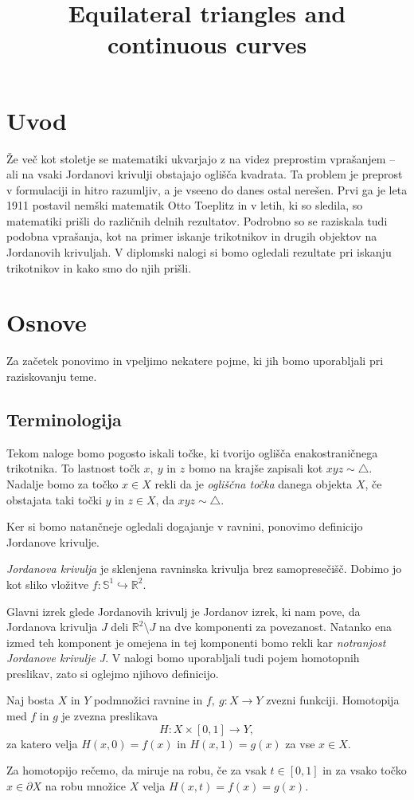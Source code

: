 \documentclass[mat1]{fmfdelo}
\title{Equilateral triangles and continuous curves}
\newcommand{\R}{\mathbb R}
\begin{document}
\section{Uvod}
Že več kot stoletje se matematiki ukvarjajo z na videz preprostim vprašanjem -- ali na vsaki Jordanovi krivulji obstajajo oglišča kvadrata. Ta problem je preprost v formulaciji in hitro razumljiv, a je vseeno do danes ostal nerešen. Prvi ga je leta 1911 postavil nemški matematik Otto Toeplitz \cite{splet_idaho} in v letih, ki so sledila, so matematiki prišli do različnih delnih rezultatov. Podrobno so se raziskala tudi podobna vprašanja, kot na primer iskanje trikotnikov in drugih objektov na Jordanovih krivuljah. V diplomski nalogi si bomo ogledali rezultate pri iskanju trikotnikov in kako smo do njih prišli.

\section{Osnove}

Za začetek ponovimo in vpeljimo nekatere pojme, ki jih bomo uporabljali pri raziskovanju teme.

\subsection{Terminologija}

Tekom naloge bomo pogosto iskali točke, ki tvorijo oglišča enakostraničnega trikotnika. To lastnost točk $x,\ y$ in $z$ bomo na krajše zapisali kot $xyz \sim \triangle$. Nadalje bomo za točko $x \in X$ rekli da je \emph{ogliščna točka} danega objekta $X$, če obstajata taki točki $y$ in $z \in X$, da $xyz \sim \triangle$.

Ker si bomo natančneje ogledali dogajanje v ravnini, ponovimo definicijo Jordanove krivulje.
\begin{definicija}
\emph{Jordanova krivulja} je sklenjena ravninska krivulja brez samopresečišč. Dobimo jo kot sliko vložitve $f\colon \mathbb{S}^1 \hookrightarrow \R^2$.
\end{definicija}
Glavni izrek glede Jordanovih krivulj je Jordanov izrek, ki nam pove, da Jordanova krivulja $J$ deli $\R^2 \setminus J$ na dve komponenti za povezanost. Natanko ena izmed teh komponent je omejena in tej komponenti bomo rekli kar \emph{notranjost Jordanove krivulje J}. V nalogi bomo uporabljali tudi pojem homotopnih preslikav, zato si oglejmo njihovo definicijo.
\begin{definicija}
Naj bosta $X$ in $Y$ podmnožici ravnine in $f,\ g\colon X \to Y$ zvezni funkciji. Homotopija med  $f$ in $g$ je zvezna preslikava
\[
H\colon X \times [0, 1] \to Y,
\]
 za katero velja $H(x, 0) = f(x)$ in $H(x, 1) = g(x)$ za vse $x\in X$.
\end{definicija}
Za homotopijo rečemo, da miruje na robu, če za vsak $t \in [0, 1]$ in za vsako točko $x \in \partial X$ na robu množice $X$ velja $H(x, t) = f(x) = g(x)$.
\end{document}
